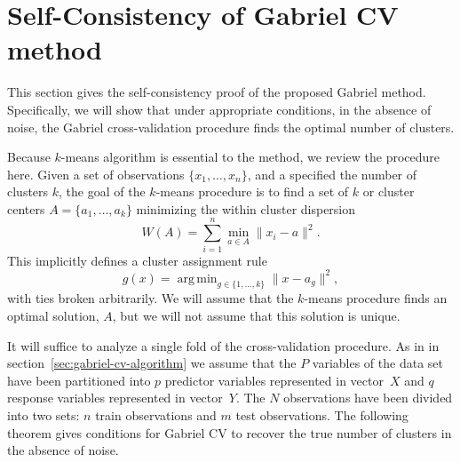 \documentclass[12pt]{article}
\DeclareMathOperator*{\argmin}{arg\,min}
\begin{document}
\section{Self-Consistency of Gabriel CV method}

This section gives the self-consistency proof of the proposed Gabriel method.
Specifically, we will show that under appropriate conditions, in the absence
of noise, the Gabriel cross-validation procedure finds the optimal number of
clusters.


Because $k$-means algorithm is essential to the method, we review the
procedure here.  Given a set of observations $\{ x_1, \dotsc ,x_n \}$, and a
specified the number of clusters $k$, the goal of the $k$-means procedure is
to find a set of $k$ or cluster centers $A = \{ a_1, \dotsc, a_k \} $
minimizing the within cluster dispersion
\[
  W(A) = \sum_{i=1}^{n} \min_{a \in A} \|x_i - a\|^2.
\]
This implicitly defines a cluster assignment rule
\[
  g(x) = \argmin_{g \in \{1, \dotsc, k\}} \|x - a_g\|^2,
\]
with ties broken arbitrarily.  We will assume that the $k$-means procedure
finds an optimal solution, $A$, but we will not assume that this solution is
unique.


It will suffice to analyze a single fold of the cross-validation procedure.
As in in section~\ref{sec:gabriel-cv-algorithm} we assume that the $P$
variables of the data set have been partitioned into $p$ predictor variables
represented in vector~$X$ and $q$ response variables represented in
vector~$Y$.  The $N$ observations have been divided into two sets: $n$ train
observations and $m$ test observations.  The following theorem gives
conditions for Gabriel CV to recover the true number of clusters in the
absence of noise.
\end{document}
